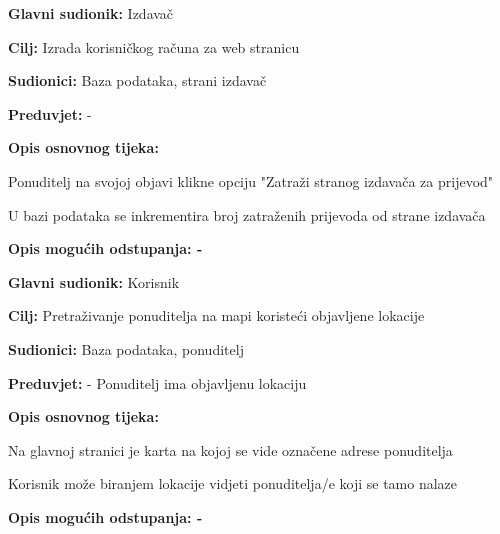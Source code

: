                     \noindent {}
					\begin{packed_item}
	
						\item \textbf{Glavni sudionik: } Izdavač
						\item  \textbf{Cilj:} Izrada korisničkog računa za web stranicu
						\item  \textbf{Sudionici:} Baza podataka, strani izdavač
						\item  \textbf{Preduvjet:} -
						\item  \textbf{Opis osnovnog tijeka:}
						
						\item[] \begin{packed_enum}
	
							\item Ponuditelj na svojoj objavi klikne opciju "Zatraži stranog izdavača za prijevod"
                            \item U bazi podataka se inkrementira broj zatraženih prijevoda od strane izdavača
						\end{packed_enum}
						
						\item  \textbf{Opis mogućih odstupanja: -}
					\end{packed_item}

                    \noindent {}
					\begin{packed_item}
	
						\item \textbf{Glavni sudionik: } Korisnik
						\item  \textbf{Cilj:} Pretraživanje ponuditelja na mapi koristeći objavljene lokacije
						\item  \textbf{Sudionici:} Baza podataka, ponuditelj
						\item  \textbf{Preduvjet:} - Ponuditelj ima objavljenu lokaciju
						\item  \textbf{Opis osnovnog tijeka:}
						
						\item[] \begin{packed_enum}
	
							\item Na glavnoj stranici je karta na kojoj se vide označene adrese ponuditelja
                            \item Korisnik može biranjem lokacije vidjeti ponuditelja/e koji se tamo nalaze
						\end{packed_enum}
						
						\item  \textbf{Opis mogućih odstupanja: -}
					\end{packed_item}

